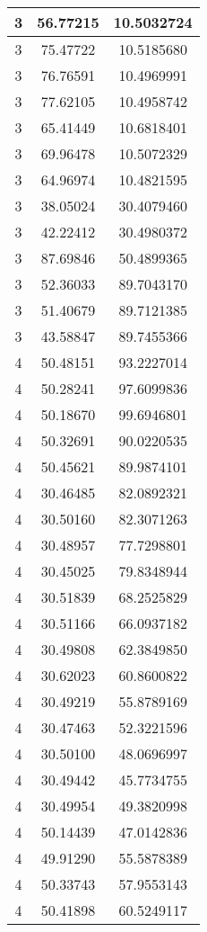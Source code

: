 \documentclass[
]{book}
\begin{document}
\begin{tabular}{c|c|c}
\hline
3 & 56.77215 & 10.5032724\\
\hline
3 & 75.47722 & 10.5185680\\
\hline
3 & 76.76591 & 10.4969991\\
\hline
3 & 77.62105 & 10.4958742\\
\hline
3 & 65.41449 & 10.6818401\\
\hline
3 & 69.96478 & 10.5072329\\
\hline
3 & 64.96974 & 10.4821595\\
\hline
3 & 38.05024 & 30.4079460\\
\hline
3 & 42.22412 & 30.4980372\\
\hline
3 & 87.69846 & 50.4899365\\
\hline
3 & 52.36033 & 89.7043170\\
\hline
3 & 51.40679 & 89.7121385\\
\hline
3 & 43.58847 & 89.7455366\\
\hline
4 & 50.48151 & 93.2227014\\
\hline
4 & 50.28241 & 97.6099836\\
\hline
4 & 50.18670 & 99.6946801\\
\hline
4 & 50.32691 & 90.0220535\\
\hline
4 & 50.45621 & 89.9874101\\
\hline
4 & 30.46485 & 82.0892321\\
\hline
4 & 30.50160 & 82.3071263\\
\hline
4 & 30.48957 & 77.7298801\\
\hline
4 & 30.45025 & 79.8348944\\
\hline
4 & 30.51839 & 68.2525829\\
\hline
4 & 30.51166 & 66.0937182\\
\hline
4 & 30.49808 & 62.3849850\\
\hline
4 & 30.62023 & 60.8600822\\
\hline
4 & 30.49219 & 55.8789169\\
\hline
4 & 30.47463 & 52.3221596\\
\hline
4 & 30.50100 & 48.0696997\\
\hline
4 & 30.49442 & 45.7734755\\
\hline
4 & 30.49954 & 49.3820998\\
\hline
4 & 50.14439 & 47.0142836\\
\hline
4 & 49.91290 & 55.5878389\\
\hline
4 & 50.33743 & 57.9553143\\
\hline
4 & 50.41898 & 60.5249117\\

\end{tabular}
\end{document}
